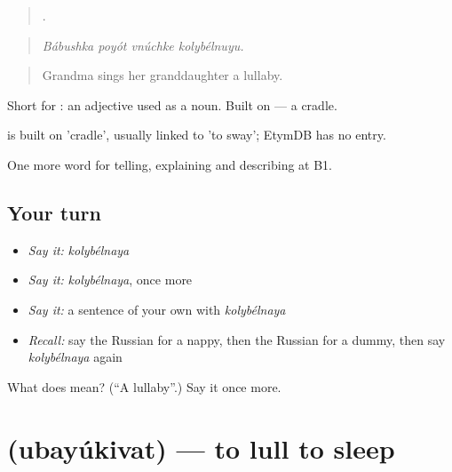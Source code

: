 \begin{quote}
   .
\end{quote}

\begin{quote}
\emph{Bábushka poyót vnúchke kolybélnuyu.}
\end{quote}

\begin{quote}
Grandma sings her granddaughter a lullaby.
\end{quote}

Short for \emph{ }: an adjective used as a noun. Built on \emph{} — a cradle.

\begin{cousinweb}
\emph{} is built on \emph{} 'cradle', usually linked to \emph{} 'to sway'; EtymDB has no entry.
\end{cousinweb}

\begin{grammarlens}[title={What you've built}]
One more word for telling, explaining and describing at B1.
\end{grammarlens}

\subsection*{Your turn}
\begin{itemize}
\raggedright
  \item \emph{Say it:} \emph{kolybélnaya}
  \item \emph{Say it:} \emph{kolybélnaya}, once more
  \item \emph{Say it:} a sentence of your own with \emph{kolybélnaya}
  \item \emph{Recall:} say the Russian for a nappy, then the Russian for a dummy, then say \emph{kolybélnaya} again
\end{itemize}

\begin{tcolorbox}[breakable,colback=teal!4,colframe=teal!35!black,title={Before you move on}]
What does  mean? (\textquotedblleft{}A lullaby\textquotedblright{}.) Say it once more.
\end{tcolorbox}
\section[\texorpdfstring{\ru{убаюкивать} (ubayúkivat)}{убаюкивать (ubayúkivat)}]{ (ubayúkivat) — to lull to sleep}

